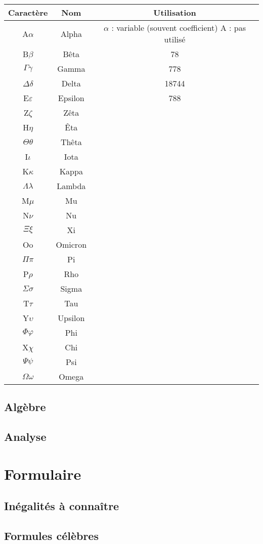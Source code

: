 \documentclass[12pt,a4paper]{book}
\theoremstyle{definition}
\theoremstyle{remark}
\begin{document}
\begin{longtable}{| c | c | c |} 
 \hline
 Caractère & Nom & Utilisation \\
 \hline\hline
 \endhead
 A$\alpha$ & Alpha & \makecell[l]{$\alpha$ : variable (souvent coefficient) \\ A : pas utilisé} \\ \hline
 B$\beta$ & Bêta & 78 \\ \hline
 $\Gamma\gamma$ & Gamma & 778\\ \hline
 $\Delta\delta$ & Delta & 18744 \\ \hline
 E$\varepsilon$ & Epsilon & 788 \\ \hline
 Z$\zeta$ & Zêta & \\ \hline
 H$\eta$ &  Êta & \\ \hline
 $\Theta\theta$ & Thêta & \\ \hline
 I$\iota$ & Iota & \\ \hline
 K$\kappa$ & Kappa & \\ \hline
 $\Lambda\lambda$ & Lambda & \\ \hline
 M$\mu$ & Mu & \\ \hline
 N$\nu$ & Nu & \\ \hline
 $\Xi\xi$ & Xi & \\ \hline
 Oo & Omicron& \\\hline 
 $\Pi\pi$ & Pi & \\ \hline
 P$\rho$ & Rho & \\ \hline
 $\Sigma\sigma$ & Sigma & \\ \hline
 T$\tau$ & Tau & \\ \hline
 Y$\upsilon$ & Upsilon & \\ \hline
 $\Phi\varphi$ & Phi & \\ \hline
 X$\chi$ & Chi & \\ \hline
 $\Psi\psi$ & Psi & \\ \hline
 $\Omega\omega$ & Omega & \\ \hline
 
\end{longtable}

\section{Algèbre}

\section{Analyse}



\chapter{Formulaire}

\section{Inégalités à connaître}

\section{Formules célèbres}
\end{document}
